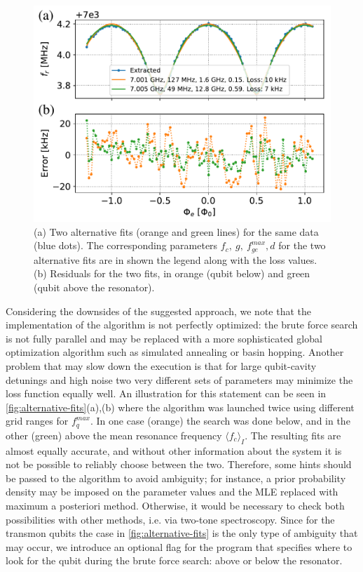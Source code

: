 \documentclass[%
 aip,
 draft,
 amsmath,amssymb,
 reprint,%
]{revtex4-1}
\begin{document}
\begin{figure}[b]
	\centering
	\includegraphics[width=\linewidth]{alternative_fits}
	\caption{(a) Two alternative fits (orange and green lines) for the same data (blue dots). The corresponding parameters $f_c,\ g,\ f_{ge}^{max}, d$ for the two alternative fits are in shown the legend along with the loss values. (b) Residuals for the two fits, in orange (qubit below) and green (qubit above the resonator).}
	\label{fig:alternative-fits}
\end{figure}


Considering the downsides of the suggested approach, we note that the implementation of the algorithm is not perfectly optimized: the brute force search is not fully parallel and may be replaced with a more sophisticated global optimization algorithm such as simulated annealing or basin hopping. Another problem that may slow down the execution is that for large qubit-cavity detunings and high noise two very different sets of parameters may minimize the loss function equally well. An illustration for this statement can be seen in \autoref{fig:alternative-fits}(a),(b) where the algorithm was launched twice using different grid ranges for $f_q^{max}$. In one case (orange) the search was done below, and in the other (green) above the mean resonance frequency $\langle f_c\rangle_{I}$. The resulting fits are almost equally accurate, and without other information about the system it is not be possible to reliably choose between the two. Therefore, some hints should be passed to the algorithm to avoid ambiguity; for instance, a prior probability density may be imposed on the parameter values and the MLE replaced with maximum a posteriori method. Otherwise, it would be necessary to check both possibilities with other methods, i.e. via two-tone spectroscopy. Since for the transmon qubits the case in \autoref{fig:alternative-fits} is the only type of ambiguity that may occur, we introduce an optional flag for the program that specifies where to look for the qubit during the brute force search: above or below the resonator.
\end{document}
